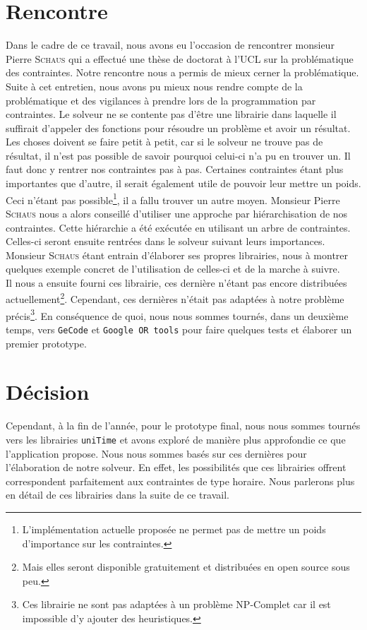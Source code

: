 \section{Rencontre}
Dans le cadre de ce travail, nous avons eu l'occasion de rencontrer monsieur Pierre \textsc{Schaus} qui a effectué une thèse de doctorat à l'UCL sur la problématique des contraintes. Notre rencontre nous a permis de mieux cerner la problématique.
\newline
\indent
Suite à cet entretien, nous avons pu mieux nous rendre compte de la problématique et des vigilances à prendre lors de la programmation par contraintes. Le solveur ne se contente pas d'être une librairie dans laquelle il suffirait d'appeler des fonctions pour résoudre un problème et avoir un résultat. Les choses doivent se faire petit à petit, car si le solveur ne trouve pas de résultat, il n'est pas possible de savoir pourquoi celui-ci n'a pu en trouver un. 
\newline
\indent
Il faut donc y rentrer nos contraintes pas à pas. Certaines contraintes étant plus importantes que d'autre, il serait également utile de pouvoir leur mettre un poids. Ceci n'étant pas possible\footnote{L'implémentation actuelle proposée ne permet pas de mettre un poids d'importance sur les contraintes.}, il a fallu trouver un autre moyen. Monsieur Pierre \textsc{Schaus} nous a alors conseillé d'utiliser une approche par hiérarchisation de nos contraintes. Cette hiérarchie a été exécutée en utilisant un arbre de contraintes. Celles-ci seront ensuite rentrées dans le solveur suivant leurs importances. Monsieur \textsc{Schaus} étant entrain d'élaborer ses propres librairies, nous à montrer quelques exemple concret de l'utilisation de celles-ci et de la marche à suivre.\\
\newline
\indent
Il nous a ensuite fourni ces librairie, ces dernière n'étant pas encore distribuées actuellement\footnote{Mais elles seront disponible gratuitement et distribuées en open source sous peu.}. Cependant, ces dernières n'était pas adaptées à notre problème précis\footnote{Ces librairie ne sont pas adaptées à un problème NP-Complet car il est impossible d'y ajouter des heuristiques.}. En conséquence de quoi, nous nous sommes tournés, dans un deuxième temps, vers  \texttt{GeCode} et \texttt{Google OR tools} pour faire quelques tests et élaborer un premier prototype.

\section{Décision}

Cependant, à la fin de l'année, pour le prototype final, nous nous sommes tournés vers les librairies \texttt{uniTime} et avons exploré de manière plus approfondie ce que l'application propose. Nous nous sommes basés sur ces dernières pour l'élaboration de notre solveur. En effet, les possibilités que ces librairies offrent correspondent parfaitement aux contraintes de type horaire. Nous parlerons plus en détail de ces librairies dans la suite de ce travail.




